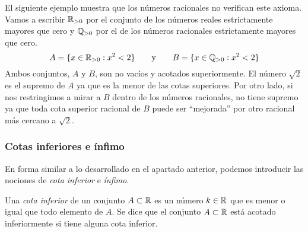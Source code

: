 \documentclass[../teoria.root.tex]{subfiles}
\begin{document}
El siguiente ejemplo muestra que los números racionales no verifican este axioma.
Vamos a escribir \(\mathbb{R}_{>0}\) por el conjunto de los números reales estrictamente mayores que cero y \(\mathbb{Q}_{>0}\) por el de los números racionales estrictamente mayores que cero.
\[A = \{x \in \mathbb{R}_{>0} : x^2 < 2\}\qquad\text{y}\qquad B = \{x \in \mathbb{Q}_{>0} : x^2 < 2\}\]
Ambos conjuntos, \(A\) y \(B\), son no vacíos y acotados superiormente.
El número \(\sqrt{2}\) es el supremo de \(A\) ya que es la menor de las cotas superiores.
Por otro lado, si nos restringimos a mirar a \(B\) dentro de los números racionales, no tiene supremo ya que toda cota superior racional de \(B\) puede ser “mejorada” por otro racional más cercano a \(\sqrt{2}\).
\subsubsection{Cotas inferiores e ínfimo}
En forma similar a lo desarrollado en el apartado anterior, podemos introducir las nociones de \textit{cota inferior} e \textit{ínfimo}.

Una \textit{cota inferior} de un conjunto \(A \subset \mathbb{R}\) es un número \(k \in \mathbb{R}\) que es menor o igual que todo elemento de \(A\).
Se dice que el conjunto \(A \subset \mathbb{R}\) está acotado inferiormente si tiene alguna cota inferior.
\end{document}
